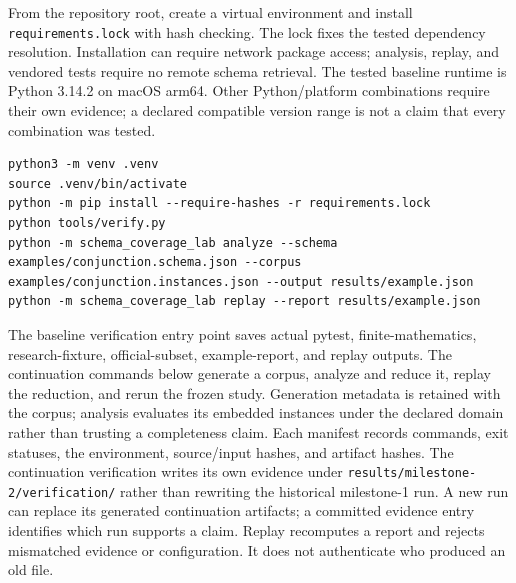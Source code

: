 \documentclass[sigconf,nonacm]{acmart}
\begin{document}
From the repository root, create a virtual environment and install \texttt{r\allowbreak{}e\allowbreak{}q\allowbreak{}u\allowbreak{}i\allowbreak{}r\allowbreak{}e\allowbreak{}m\allowbreak{}e\allowbreak{}n\allowbreak{}t\allowbreak{}s\allowbreak{}.\allowbreak{}l\allowbreak{}o\allowbreak{}c\allowbreak{}k} with hash checking. The lock fixes the tested dependency resolution. Installation can require network package access; analysis, replay, and vendored tests require no remote schema retrieval. The tested baseline runtime is Python 3.14.2 on macOS arm64. Other Python/platform combinations require their own evidence; a declared compatible version range is not a claim that every combination was tested.

\begin{lstlisting}
python3 -m venv .venv
source .venv/bin/activate
python -m pip install --require-hashes -r requirements.lock
python tools/verify.py
python -m schema_coverage_lab analyze --schema examples/conjunction.schema.json --corpus examples/conjunction.instances.json --output results/example.json
python -m schema_coverage_lab replay --report results/example.json
\end{lstlisting}
The baseline verification entry point saves actual pytest, finite-mathematics, research-fixture, official-subset, example-report, and replay outputs. The continuation commands below generate a corpus, analyze and reduce it, replay the reduction, and rerun the frozen study. Generation metadata is retained with the corpus; analysis evaluates its embedded instances under the declared domain rather than trusting a completeness claim. Each manifest records commands, exit statuses, the environment, source/input hashes, and artifact hashes. The continuation verification writes its own evidence under \texttt{r\allowbreak{}e\allowbreak{}s\allowbreak{}u\allowbreak{}l\allowbreak{}t\allowbreak{}s\allowbreak{}/\allowbreak{}m\allowbreak{}i\allowbreak{}l\allowbreak{}e\allowbreak{}s\allowbreak{}t\allowbreak{}o\allowbreak{}n\allowbreak{}e\allowbreak{}-\allowbreak{}2\allowbreak{}/\allowbreak{}v\allowbreak{}e\allowbreak{}r\allowbreak{}i\allowbreak{}f\allowbreak{}i\allowbreak{}c\allowbreak{}a\allowbreak{}t\allowbreak{}i\allowbreak{}o\allowbreak{}n\allowbreak{}/} rather than rewriting the historical milestone-1 run. A new run can replace its generated continuation artifacts; a committed evidence entry identifies which run supports a claim. Replay recomputes a report and rejects mismatched evidence or configuration. It does not authenticate who produced an old file.
\end{document}
